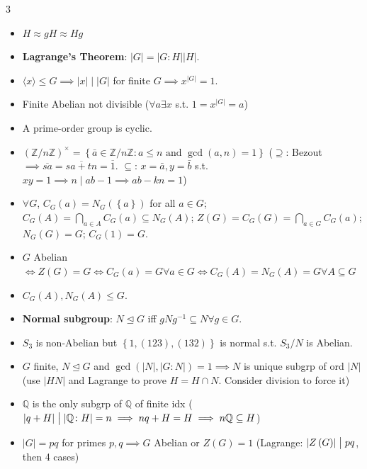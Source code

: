 \documentclass[10pt]{article}
\newcommand{\Q}{\mathbb{Q}} %
\newcommand{\Z}{\mathbb{Z}} %
\newcommand{\abs}[1]{\left\lvert#1\right\rvert} %
\begin{document}
\begin{multicols*}{3}
\begin{itemize}
            \item $H \approx gH \approx Hg$
            \item \textbf{Lagrange's Theorem}: $\abs{G} = \abs{G \colon H}\abs{H}$.
            \item $\langle x \rangle \leq G \implies \abs{x} \mid \abs{G}$ for finite $G \implies x^{\abs{G}} = 1$.
            \item Finite Abelian not divisible ($\forall a \exists x$ s.t. $1 = x^{\abs{G}} = a$)
            \item A prime-order group is cyclic.
            \item $\left(\Z \slash n\Z\right)^{\times} = \left\{\bar{a} \in \Z \slash n\Z \colon a \leq n \textrm{ and } \gcd\left(a, n\right) = 1\right\}$ ($\supseteq$: Bezout $\implies \overline{sa} = \overline{sa + tn} = \overline{1}$. $\subseteq$: $x = \bar{a}, y = \bar{b}$ s.t. $xy = 1 \implies n \mid ab - 1 \implies ab - kn = 1$)
            \item $\forall G$, $C_G\left(a\right) = N_G\left(\left\{a\right\}\right)$ for all $a \in G$; $C_G\left(A\right) = \bigcap_{a \in A}C_G\left(a\right) \subseteq N_G\left(A\right)$; $Z\left(G\right) = C_G\left(G\right) = \bigcap_{a \in G}C_G\left(a\right)$; $N_G\left(G\right) = G$; $C_G\left(1\right) = G$.
            \item $G$ Abelian $\iff Z\left(G\right) = G \iff C_G\left(a\right) = G \forall a \in G \iff C_G\left(A\right) = N_G\left(A\right) = G \forall A \subseteq G$
            \item $C_G\left(A\right), N_G\left(A\right) \leq G$.
            \item \textbf{Normal subgroup}: $N \trianglelefteq G$ iff $gNg^{-1} \subseteq N \forall g \in G$.
            \item $S_3$ is non-Abelian but $\left\{1, \left(123\right), \left(132\right)\right\}$ is normal s.t. $S_3 \slash N$ is Abelian.
            \item $G$ finite, $N \trianglelefteq G$ and $\gcd\left(\abs{N}, \abs{G \colon N}\right) = 1 \implies N$ is unique subgrp of ord $\abs{N}$ (use $\abs{HN}$ and Lagrange to prove $H = H \cap N$. Consider division to force it)
            \item $\Q$ is the only subgrp of $\Q$ of finite idx ($\abs{q + H} \bigm\vert \abs{\Q \colon H} = n \implies nq + H = H \implies n\Q \subseteq H$)
            \item $\abs{G} = pq$ for primes $p, q \implies G$ Abelian or $Z\left(G\right) = 1$ (Lagrange: $\abs{Z\left(G\right)} \bigm\vert pq$, then 4 cases)

\end{itemize}
\end{multicols*}
\end{document}
